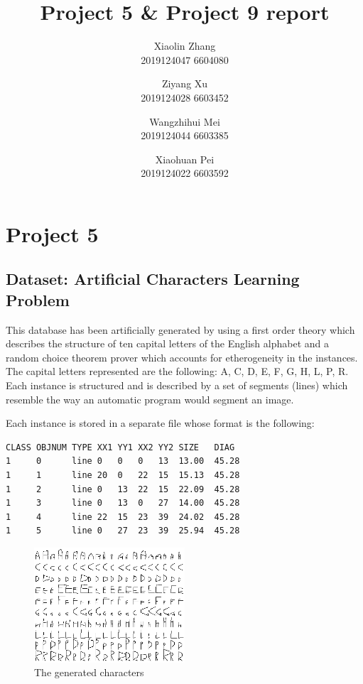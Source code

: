 \documentclass[11pt,en]{elegantpaper}
\title{Project 5 \& Project 9 report}
\author{Xiaolin Zhang \\ 2019124047 6604080 \and Ziyang Xu \\2019124028 6603452  \and Wangzhihui Mei \\ 2019124044 6603385  \and Xiaohuan Pei \\ 2019124022 6603592}
\institute{CCNU-UOW JI}
\date{}
\begin{document}
\maketitle


\section{Project 5}
\subsection{Dataset: Artificial Characters Learning Problem}

This database has been artificially generated by using a first order theory which describes the structure of ten capital letters of the English alphabet and a random choice theorem prover which accounts for etherogeneity in the instances. The capital letters represented are the following: A, C, D, E, F, G, H, L, P, R. Each instance is structured and is described by a set of segments (lines) which resemble the way an automatic program would segment an image. 


Each instance is stored in a separate file whose format is the following:
\begin{lstlisting}
CLASS OBJNUM TYPE XX1 YY1 XX2 YY2 SIZE   DIAG
1     0      line 0   0   0   13  13.00  45.28
1     1      line 20  0   22  15  15.13  45.28
1     2      line 0   13  22  15  22.09  45.28
1     3      line 0   13  0   27  14.00  45.28
1     4      line 22  15  23  39  24.02  45.28
1     5      line 0   27  23  39  25.94  45.28
\end{lstlisting}

\begin{figure}[h]
	\centering
	\includegraphics[width=0.5\textwidth]{image/chars}
	\caption{The generated characters}
	\label{chars}
\end{figure}
\end{document}
